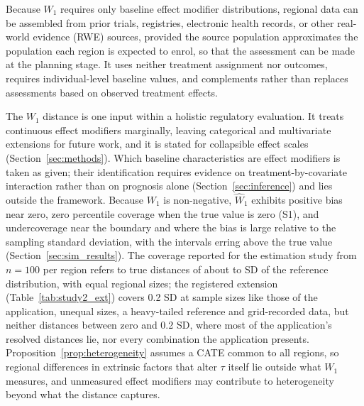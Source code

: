 \documentclass[AMA,Times1COL]{WileyNJDv5}
\begin{document}
Because $W_1$ requires only baseline effect modifier distributions, regional data can be assembled from prior trials, registries, electronic health records, or other real-world evidence (RWE) sources, provided the source population approximates the population each region is expected to enrol, so that the assessment can be made at the planning stage. It uses neither treatment assignment nor outcomes, requires individual-level baseline values, and complements rather than replaces assessments based on observed treatment effects.

The $W_1$ distance is one input within a holistic regulatory evaluation.\cite{matsushima2024} It treats continuous effect modifiers marginally, leaving categorical and multivariate extensions for future work, and it is stated for collapsible effect scales (Section~\ref{sec:methods}). Which baseline characteristics are effect modifiers is taken as given; their identification requires evidence on treatment-by-covariate interaction rather than on prognosis alone (Section~\ref{sec:inference}) and lies outside the framework.
Because $W_1$ is non-negative, $\widehat{W}_1$ exhibits positive bias near zero, zero percentile coverage when the true value is zero (S1), and undercoverage near the boundary and where the bias is large relative to the sampling standard deviation, with the intervals erring above the true value (Section~\ref{sec:sim_results}). The coverage reported for the estimation study from $n = 100$ per region refers to true distances of about  to  SD of the reference distribution, with equal regional sizes; the registered extension (Table~\ref{tab:study2_ext}) covers 0.2 SD at sample sizes like those of the application, unequal sizes, a heavy-tailed reference and grid-recorded data, but neither distances between zero and 0.2 SD, where most of the application's resolved distances lie, nor every combination the application presents. Proposition~\ref{prop:heterogeneity} assumes a CATE common to all regions, so regional differences in extrinsic factors that alter $\tau$ itself lie outside what $W_1$ measures, and unmeasured effect modifiers may contribute to heterogeneity beyond what the distance captures.
\end{document}
